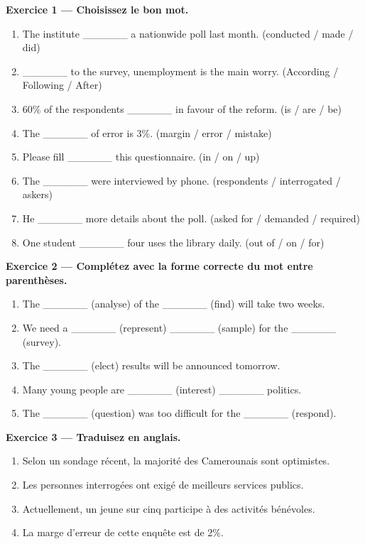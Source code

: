 \documentclass[11pt]{article}
\begin{document}
\begin{exercice}
\textbf{Exercice 1 — Choisissez le bon mot.}
\begin{enumerate}
\item The institute \_\_\_\_\_\_ a nationwide poll last month. (conducted / made / did)
\item \_\_\_\_\_\_ to the survey, unemployment is the main worry. (According / Following / After)
\item 60\% of the respondents \_\_\_\_\_\_ in favour of the reform. (is / are / be)
\item The \_\_\_\_\_\_ of error is 3\%. (margin / error / mistake)
\item Please fill \_\_\_\_\_\_ this questionnaire. (in / on / up)
\item The \_\_\_\_\_\_ were interviewed by phone. (respondents / interrogated / askers)
\item He \_\_\_\_\_\_ more details about the poll. (asked for / demanded / required)
\item One student \_\_\_\_\_\_ four uses the library daily. (out of / on / for)
\end{enumerate}

\textbf{Exercice 2 — Complétez avec la forme correcte du mot entre parenthèses.}
\begin{enumerate}
\item The \_\_\_\_\_\_ (analyse) of the \_\_\_\_\_\_ (find) will take two weeks.
\item We need a \_\_\_\_\_\_ (represent) \_\_\_\_\_\_ (sample) for the \_\_\_\_\_\_ (survey).
\item The \_\_\_\_\_\_ (elect) results will be announced tomorrow.
\item Many young people are \_\_\_\_\_\_ (interest) \_\_\_\_\_\_ politics.
\item The \_\_\_\_\_\_ (question) was too difficult for the \_\_\_\_\_\_ (respond).
\end{enumerate}

\textbf{Exercice 3 — Traduisez en anglais.}
\begin{enumerate}
\item Selon un sondage récent, la majorité des Camerounais sont optimistes.
\item Les personnes interrogées ont exigé de meilleurs services publics.
\item Actuellement, un jeune sur cinq participe à des activités bénévoles.
\item La marge d'erreur de cette enquête est de 2\%.
\end{enumerate}
\end{exercice}
\end{document}
